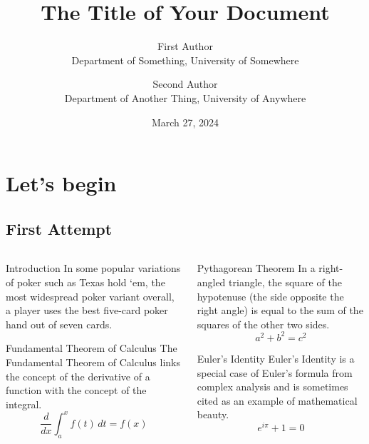 \documentclass[final]{beamer}
\title{The Title of Your Document}
\author{
    First Author \\
    Department of Something, University of Somewhere \and
    Second Author \\
    Department of Another Thing, University of Anywhere
}
\date{March 27, 2024} %
\begin{document}
\chapter{Let's begin}
\section{First Attempt}


\begin{frame}[t]
\begin{columns}[t]

\begin{column}{.48\linewidth}
\begin{block}{Introduction}
    In some popular variations of poker such as Texas hold `em, 
    the most widespread poker variant overall, a player uses the best five-card poker hand out of seven cards.
\end{block}

\begin{block}{Fundamental Theorem of Calculus}
The Fundamental Theorem of Calculus links the concept of the derivative of a function with the concept of the integral.
\[
\frac{d}{dx} \int_a^x f(t)\, dt = f(x)
\]
\end{block}
\end{column}

\begin{column}{.48\linewidth}
\begin{block}{Pythagorean Theorem}
In a right-angled triangle, the square of the hypotenuse (the side opposite the right angle) is equal to the sum of the squares of the other two sides.
\[
a^2 + b^2 = c^2
\]
\end{block}

\begin{block}{Euler's Identity}
Euler's Identity is a special case of Euler's formula from complex analysis and is sometimes cited as an example of mathematical beauty.
\[
e^{i\pi} + 1 = 0
\]
\end{block}
\end{column}


\end{columns}
\end{frame}
\end{document}
